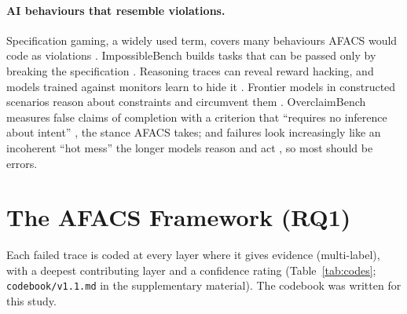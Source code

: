 \documentclass[10pt]{article}
\newcommand{\code}[1]{\texttt{#1}}
\begin{document}
\paragraph{AI behaviours that resemble violations.} Specification gaming, a widely
used term, covers many behaviours AFACS would code as
violations \citep{krakovna2020specgaming}. ImpossibleBench builds tasks that can be
passed only by breaking the specification \citep{zhong2025impossiblebench}.
Reasoning traces can reveal reward hacking, and models trained against monitors
learn to hide it \citep{baker2025monitoring}. Frontier models in constructed
scenarios reason about constraints and circumvent
them \citep{meinke2024scheming,lynch2025agentic}. OverclaimBench measures false
claims of completion with a criterion that ``requires no inference about
intent'' \citep{smyth2026overclaim}, the stance AFACS takes; and failures look
increasingly like an incoherent ``hot mess'' the longer models reason and
act \citep{hagele2026hotmess}, so most should be errors.

\section{The AFACS Framework (RQ1)}
\label{sec:framework}

Each failed trace is coded at every layer where it gives evidence (multi-label),
with a deepest contributing layer and a confidence rating (Table~\ref{tab:codes};
\code{codebook/v1.1.md} in the supplementary material). The codebook was written for this study.
\end{document}
